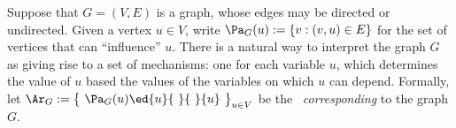     \label{sec:bns}
%    
Suppose that
$G = (V,E)$ is a graph, whose edges may be directed or undirected.
Given a vertex $u \in V$,
write $\Pa_G(u) := \{ v : (v,u) \in E\}$
    for the set of vertices that can ``influence'' $u$.
There is a natural way to interpret the graph $G$ as giving rise to a set of mechanisms:
    one for each variable $u$, 
    which determines the value of $u$ based
    the values of the variables on which $u$ can depend. 
Formally, let
$\Ar_G := 
    \smash{\big\{} 
    ~{\Pa}_G(u) \ed{u}{~}{~} \{ u \} ~
    \smash{\big\}_{u \in V}}$
be the \hgraph\ \emph{corresponding} to the graph $G$.
